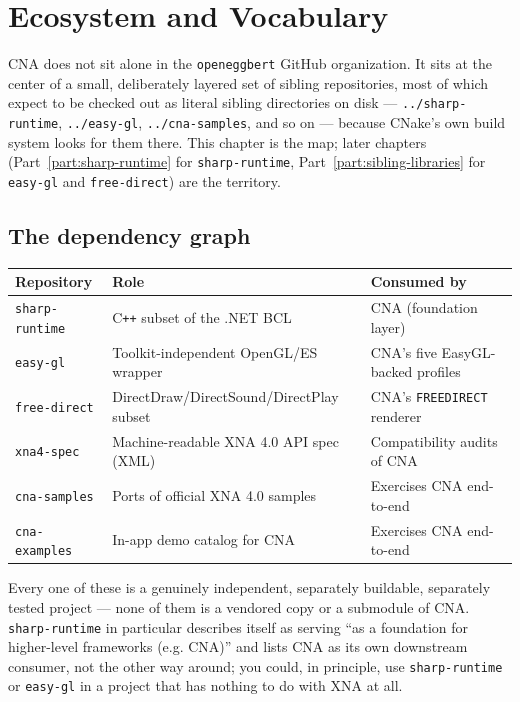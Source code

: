 \chapter{Ecosystem and Vocabulary}
\label{ch:ecosystem-vocabulary}
\label{ch:ecosystem-map}

CNA does not sit alone in the \texttt{openeggbert} GitHub organization. It sits at the
center of a small, deliberately layered set of sibling repositories, most of which expect to
be checked out as literal sibling directories on disk --- \texttt{../sharp-runtime},
\texttt{../easy-gl}, \texttt{../cna-samples}, and so on --- because CNake's own build system
looks for them there. This chapter is the map; later chapters (Part~\ref{part:sharp-runtime} for
\texttt{sharp-runtime}, Part~\ref{part:sibling-libraries} for \texttt{easy-gl} and \texttt{free-direct}) are the
territory.



\section{The dependency graph}

\begin{center}
\begin{tabular}{lll}
\toprule
\textbf{Repository} & \textbf{Role} & \textbf{Consumed by} \\
\midrule
\texttt{sharp-runtime} & C\texttt{++} subset of the .NET BCL & CNA (foundation layer) \\
\texttt{easy-gl} & Toolkit-independent OpenGL/ES wrapper & CNA's five EasyGL-backed profiles \\
\texttt{free-direct} & DirectDraw/DirectSound/DirectPlay subset & CNA's \texttt{FREEDIRECT} renderer \\
\texttt{xna4-spec} & Machine-readable XNA 4.0 API spec (XML) & Compatibility audits of CNA \\
\texttt{cna-samples} & Ports of official XNA 4.0 samples & Exercises CNA end-to-end \\
\texttt{cna-examples} & In-app demo catalog for CNA & Exercises CNA end-to-end \\
\bottomrule
\end{tabular}
\end{center}

Every one of these is a genuinely independent, separately buildable, separately tested
project --- none of them is a vendored copy or a submodule of CNA. \texttt{sharp-runtime} in
particular describes itself as serving ``as a foundation for higher-level frameworks (e.g.
CNA)'' and lists CNA as its own downstream consumer, not the other way around; you could, in
principle, use \texttt{sharp-runtime} or \texttt{easy-gl} in a project that has nothing to do
with XNA at all.

